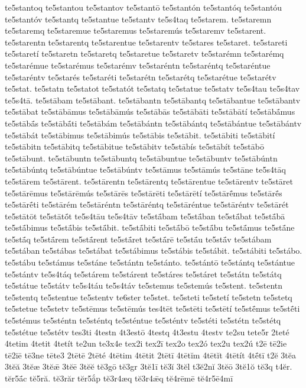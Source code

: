 {te5stantoq
te5stantou
te5stantov
te5stantō
te5stantón
te5stantóq
te5stantóu
te5stantóv
te5stantq
te5stantue
te5stantv
te5s4taq
te5starem.
te5staremn
te5staremq
te5staremue
te5staremus
te5staremús
te5staremv
te5starent.
te5starentn
te5starentq
te5starentue
te5starentv
te5stares
te5staret.
te5stareti
te5staretí
te5staretn
te5staretq
te5staretue
te5staretv
te5starémn
te5starémq
te5starémue
te5starémus
te5starémv
te5staréntn
te5staréntq
te5staréntue
te5staréntv
te5starés
te5staréti
te5starétn
te5starétq
te5starétue
te5starétv
te5stat.
te5statn
te5statot
te5statót
te5statq
te5statue
te5statv
te5s4tau
te5s4tav
te5s4tā.
te5stābam
te5stābant.
te5stābantn
te5stābantq
te5stābantue
te5stābantv
te5stābat
te5stābāmus
te5stābāmús
te5stābās
te5stābāti
te5stābātí
te5stābā́mus
te5stābā́s
te5stābā́ti
te5stābám
te5stābántn
te5stābántq
te5stābántue
te5stābántv
te5stābát
te5stābimus
te5stābimús
te5stābis
te5stābit.
te5stābiti
te5stābití
te5stābitn
te5stābitq
te5stābitue
te5stābitv
te5stābís
te5stābít
te5stābō
te5stābunt.
te5stābuntn
te5stābuntq
te5stābuntue
te5stābuntv
te5stābúntn
te5stābúntq
te5stābúntue
te5stābúntv
te5stāmus
te5stāmús
te5stāne
te5s4tāq
te5stārem
te5stārent.
te5stārentn
te5stārentq
te5stārentue
te5stārentv
te5stāret
te5stārēmus
te5stārēmús
te5stārēs
te5stārēti
te5stārētí
te5stārḗmus
te5stārḗs
te5stārḗti
te5stārém
te5stāréntn
te5stāréntq
te5stāréntue
te5stāréntv
te5stārét
te5stātōt
te5stātṓt
te5s4tāu
te5s4tāv
te5stā́bam
te5stā́ban
te5stā́bat
te5stā́bā
te5stā́bimus
te5stā́bis
te5stā́bit.
te5stā́biti
te5stā́bō
te5stā́bu
te5stā́mus
te5stā́ne
te5stā́q
te5stā́rem
te5stā́rent
te5stā́ret
te5stā́rē
te5stā́u
te5stā́v
te5stábam
te5stában
te5stábas
te5stábat
te5stábimus
te5stábis
te5stábit.
te5stábiti
te5stábo.
te5stábu
te5stámus
te5stáne
te5stántn
te5stánto.
te5stántō
te5stántq
te5stántue
te5stántv
te5s4táq
te5stárem
te5stárent
te5stáres
te5stáret
te5státn
te5státq
te5státue
te5státv
te5s4táu
te5s4táv
te5stemus
te5stemús
te5stent.
te5stentn
te5stentq
te5stentue
te5stentv
te6ster
te5stet.
te5steti
te5stetí
te5stetn
te5stetq
te5stetue
te5stetv
te5stēmus
te5stēmús
tes4tēt
te5stēti
te5stētí
te5stḗmus
te5stḗti
te5stémus
te5sténtn
te5sténtq
te5sténtue
te5sténtv
te5stéti
te5stétn
te5stétq
te5stétue
te5stétv
tes3ti
4testn
4t3estō
4testq
4t3estu
4testv
te2su
tete5r
2teté
4tetim
4tetit
4tetít
te2un
te3x4e
tex2i
tex2ī
tex2o
tex2ó
tex2u
tex2ú
t2ē
tē2ie
tē2iē
tē3ne
tēte3
2tētē
2tēté
4tētim
4tētit
2tētī
4tētĭm
4tētĭt
4tētít
4tḗtī
t2ĕ
3tĕa
3tĕă
3tĕæ
3tĕǣ
3tĕē
3tĕĕ
tĕ3gō
tĕ3gr
3tĕ1ī
tĕ3ĭ
3tĕl
t3ĕ2nĭ
3tĕō
3tĕ1ŏ
tĕ3q
t4ĕr.
tĕr5ā́c
tĕ5ră.
tĕ3răr
tĕr5ắp
tĕ3r4æq
tĕ3r4ǣq
tĕ4rēmē
tĕ4r5ē4mī
}
